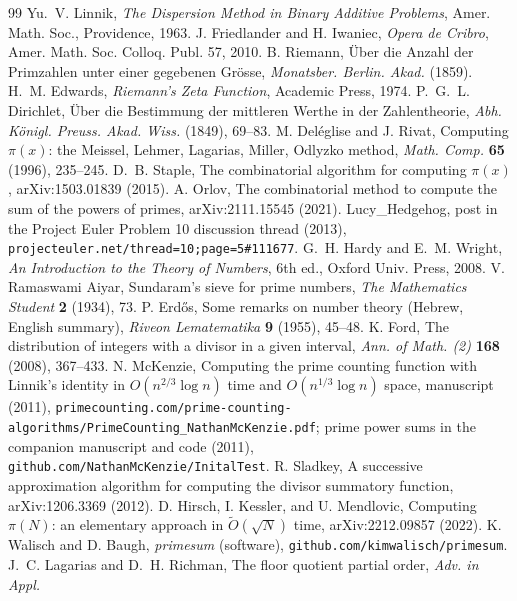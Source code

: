 \documentclass[11pt]{article}
\theoremstyle{remark}
\begin{document}
\begin{thebibliography}{99}
 Yu.~V. Linnik, \emph{The Dispersion Method in Binary Additive Problems}, Amer. Math.
Soc., Providence, 1963.
 J. Friedlander and H. Iwaniec, \emph{Opera de Cribro}, Amer. Math. Soc. Colloq. Publ.
57, 2010.
 B. Riemann, \"Uber die Anzahl der Primzahlen unter einer gegebenen Gr\"osse,
\emph{Monatsber. Berlin. Akad.} (1859).
 H.~M. Edwards, \emph{Riemann's Zeta Function}, Academic Press, 1974.
 P.~G.~L. Dirichlet, \"Uber die Bestimmung der mittleren Werthe in der
Zahlentheorie, \emph{Abh. K\"onigl. Preuss. Akad. Wiss.} (1849), 69--83.
 M. Del\'eglise and J. Rivat, Computing $\pi(x)$: the Meissel, Lehmer, Lagarias, Miller,
Odlyzko method, \emph{Math. Comp.} \textbf{65} (1996), 235--245.
 D.~B. Staple, The combinatorial algorithm for computing $\pi(x)$, arXiv:1503.01839
(2015).
 A. Orlov, The combinatorial method to compute the sum of the powers of primes,
arXiv:2111.15545 (2021).
 Lucy\_Hedgehog, post in the Project Euler Problem 10 discussion thread (2013),
\texttt{projecteuler.net/thread=10;page=5\#111677}.
 G.~H. Hardy and E.~M. Wright, \emph{An Introduction to the Theory of Numbers}, 6th ed.,
Oxford Univ. Press, 2008.
 V. Ramaswami Aiyar, Sundaram's sieve for prime numbers, \emph{The Mathematics
Student} \textbf{2} (1934), 73.
 P. Erd\H{o}s, Some remarks on number theory (Hebrew, English summary),
\emph{Riveon Lematematika} \textbf{9} (1955), 45--48.
 K. Ford, The distribution of integers with a divisor in a given interval,
\emph{Ann. of Math. (2)} \textbf{168} (2008), 367--433.
 N. McKenzie, Computing the prime counting function with Linnik's identity in
$O(n^{2/3} \log n)$ time and $O(n^{1/3} \log n)$ space, manuscript (2011),
\texttt{primecounting.com/prime-counting-algorithms/}\allowbreak\texttt{PrimeCounting\_NathanMcKenzie.pdf}; prime power
sums in the companion manuscript and code (2011), \texttt{github.com/NathanMcKenzie/InitalTest}.
 R. Sladkey, A successive approximation algorithm for computing the divisor
summatory function, arXiv:1206.3369 (2012).
 D. Hirsch, I. Kessler, and U. Mendlovic, Computing $\pi(N)$: an elementary approach in
$\widetilde{O}(\sqrt{N})$ time, arXiv:2212.09857 (2022).
 K. Walisch and D. Baugh, \emph{primesum} (software),
\texttt{github.com/kimwalisch/primesum}.
 J.~C. Lagarias and D.~H. Richman, The floor quotient partial order, \emph{Adv. in Appl.
}
\end{thebibliography}
\end{document}
